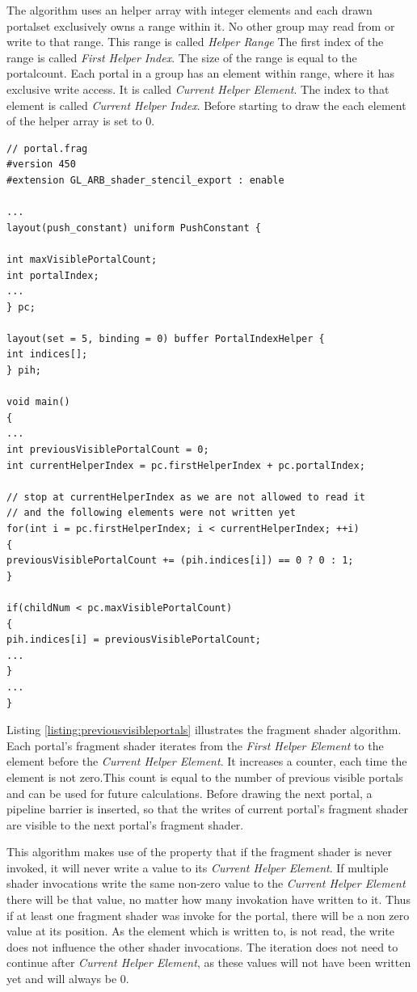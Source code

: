 The algorithm uses an helper array with integer elements and each drawn \gls{portalset} exclusively owns a range within it. No other group may read from or write to that range. This range is called \textit{Helper Range} The first index of the range is called \textit{First Helper Index}. The size of the range is equal to the \gls{portalcount}. Each portal in a group has an element within range, where it has exclusive write access. It is called \textit{Current Helper Element}. The index to that element is called \textit{Current Helper Index}. Before starting to draw the each element of the helper array is set to 0.

\begin{lstlisting}[caption={Calculate Previous Visible Portals}, label=listing:previousvisibleportals]
// portal.frag
#version 450
#extension GL_ARB_shader_stencil_export : enable

...
layout(push_constant) uniform PushConstant {	

int maxVisiblePortalCount;
int portalIndex;
...
} pc;

layout(set = 5, binding = 0) buffer PortalIndexHelper {
int indices[];
} pih;

void main()
{
...
int previousVisiblePortalCount = 0;
int currentHelperIndex = pc.firstHelperIndex + pc.portalIndex;

// stop at currentHelperIndex as we are not allowed to read it
// and the following elements were not written yet
for(int i = pc.firstHelperIndex; i < currentHelperIndex; ++i)
{
previousVisiblePortalCount += (pih.indices[i]) == 0 ? 0 : 1;
}

if(childNum < pc.maxVisiblePortalCount)
{
pih.indices[i] = previousVisiblePortalCount;
...
}
...
}
\end{lstlisting}

Listing \ref{listing:previousvisibleportals} illustrates the fragment shader algorithm. Each portal's fragment shader iterates from the \textit{First Helper Element} to the element before the \textit{Current Helper Element}. It increases a counter, each time the element is not zero.This count is equal to the number of previous visible portals and can be used for future calculations. Before drawing the next portal, a pipeline barrier is inserted, so that the writes of current portal's fragment shader are visible to the next portal's fragment shader.

This algorithm makes use of the property that if the fragment shader is never invoked, it will never write a value to its \textit{Current Helper Element}. If multiple shader invocations write the same non-zero value to the \textit{Current Helper Element} there will be that value, no matter how many invokation have written to it.
Thus if at least one fragment shader was invoke for the portal, there will be a non zero value at its position. As the element which is written to, is not read, the write does not influence the other shader invocations. The iteration does not need to continue after \textit{Current Helper Element}, as these values will not have been written yet and will always be 0.

